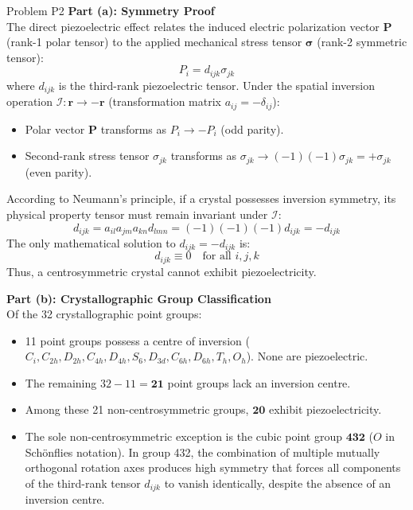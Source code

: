 \documentclass[11pt,a4paper]{article}
\begin{document}
\begin{solbox}{Problem P2}
\textbf{Part (a): Symmetry Proof} \\
The direct piezoelectric effect relates the induced electric polarization vector $\mathbf{P}$ (rank-1 polar tensor) to the applied mechanical stress tensor $\boldsymbol{\sigma}$ (rank-2 symmetric tensor):
\begin{equation}
    P_i = d_{ijk} \sigma_{jk}
\end{equation}
where $d_{ijk}$ is the third-rank piezoelectric tensor.
Under the spatial inversion operation $\mathcal{I}: \mathbf{r} \to -\mathbf{r}$ (transformation matrix $a_{ij} = -\delta_{ij}$):
\begin{itemize}
    \item Polar vector $\mathbf{P}$ transforms as $P_i \to -P_i$ (odd parity).
    \item Second-rank stress tensor $\sigma_{jk}$ transforms as $\sigma_{jk} \to (-1)(-1)\sigma_{jk} = +\sigma_{jk}$ (even parity).
\end{itemize}
According to Neumann's principle, if a crystal possesses inversion symmetry, its physical property tensor must remain invariant under $\mathcal{I}$:
\begin{equation}
    d_{ijk} = a_{il} a_{jm} a_{kn} d_{lmn} = (-1)(-1)(-1) d_{ijk} = -d_{ijk}
\end{equation}
The only mathematical solution to $d_{ijk} = -d_{ijk}$ is:
\begin{equation}
    d_{ijk} \equiv 0 \quad \text{for all } i, j, k
\end{equation}
Thus, a centrosymmetric crystal cannot exhibit piezoelectricity.

\textbf{Part (b): Crystallographic Group Classification} \\
Of the 32 crystallographic point groups:
\begin{itemize}
    \item 11 point groups possess a centre of inversion ($C_i, C_{2h}, D_{2h}, C_{4h}, D_{4h}, S_6, D_{3d}, C_{6h}, D_{6h}, T_h, O_h$). None are piezoelectric.
    \item The remaining $32 - 11 = \mathbf{21}$ point groups lack an inversion centre.
    \item Among these 21 non-centrosymmetric groups, $\mathbf{20}$ exhibit piezoelectricity.
    \item The sole non-centrosymmetric exception is the cubic point group $\mathbf{432}$ ($O$ in Schönflies notation). In group 432, the combination of multiple mutually orthogonal rotation axes produces high symmetry that forces all components of the third-rank tensor $d_{ijk}$ to vanish identically, despite the absence of an inversion centre.
\end{itemize}
\end{solbox}
\end{document}
